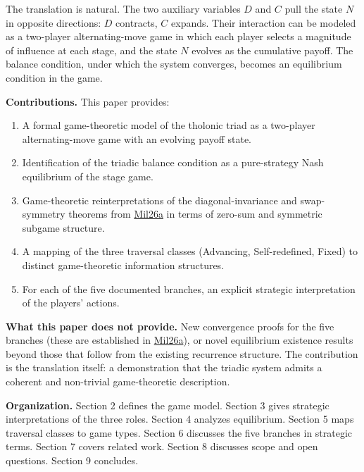 \documentclass[12pt]{article}
\providecommand{\tightlist}{%
  \setlength{\itemsep}{0pt}\setlength{\parskip}{0pt}}
\begin{document}
The translation is natural. The two auxiliary variables \(D\) and \(C\)
pull the state \(N\) in opposite directions: \(D\) contracts, \(C\)
expands. Their interaction can be modeled as a two-player
alternating-move game in which each player selects a magnitude of
influence at each stage, and the state \(N\) evolves as the cumulative
payoff. The balance condition, under which the system converges, becomes
an equilibrium condition in the game.

\textbf{Contributions.} This paper provides:

\begin{enumerate}
\def\labelenumi{\arabic{enumi}.}
\tightlist
\item
  A formal game-theoretic model of the tholonic triad as a two-player
  alternating-move game with an evolving payoff state.
\item
  Identification of the triadic balance condition as a pure-strategy
  Nash equilibrium of the stage game.
\item
  Game-theoretic reinterpretations of the diagonal-invariance and
  swap-symmetry theorems from
  \href{https://github.com/baardev/truevalue/blob/main/docnav/Research/papers/1_recursive-tholonic-five-constants/1_recursive-tholonic-five-constants.pdf}{Mil26a}
  in terms of zero-sum and symmetric subgame structure.
\item
  A mapping of the three traversal classes (Advancing, Self-redefined,
  Fixed) to distinct game-theoretic information structures.
\item
  For each of the five documented branches, an explicit strategic
  interpretation of the players' actions.
\end{enumerate}

\textbf{What this paper does not provide.} New convergence proofs for
the five branches (these are established in
\href{https://github.com/baardev/truevalue/blob/main/docnav/Research/papers/1_recursive-tholonic-five-constants/1_recursive-tholonic-five-constants.pdf}{Mil26a}),
or novel equilibrium existence results beyond those that follow from the
existing recurrence structure. The contribution is the translation
itself: a demonstration that the triadic system admits a coherent and
non-trivial game-theoretic description.

\textbf{Organization.} Section 2 defines the game model. Section 3 gives
strategic interpretations of the three roles. Section 4 analyzes
equilibrium. Section 5 maps traversal classes to game types. Section 6
discusses the five branches in strategic terms. Section 7 covers related
work. Section 8 discusses scope and open questions. Section 9 concludes.
\end{document}
